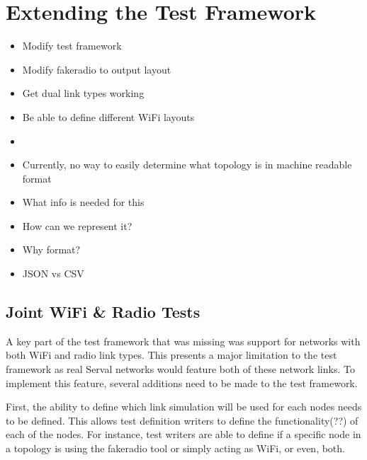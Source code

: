 
\chapter{Extending the Test Framework} %
\label{Chapter4}


\begin{itemize}
    \item Modify test framework
    \item Modify fakeradio to output layout
    \item Get dual link types working
    \item Be able to define different WiFi layouts
    \item 
\end{itemize}


\begin{itemize}
    \item Currently, no way to easily determine what topology is in machine readable format
    \item What info is needed for this 
    \item How can we represent it?
    \item Why format?
    \item JSON vs CSV
\end{itemize}


\section{Joint WiFi \& Radio Tests}
A key part of the test framework that was missing was support for networks with both WiFi and radio link types. 
This presents a major limitation  to the test framework as real Serval networks would feature both of these network links.
To implement this feature, several additions need to be made to the test framework.

First, the ability to define which link simulation will be used for each nodes needs to be defined.
This allows test definition writers to define the functionality(??) of each of the nodes. 
For instance, test writers are able to define if a specific node in a topology is using the fakeradio tool or simply acting as WiFi, or even, both. 


